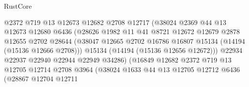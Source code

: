 \begin{lexlean}{RustCore}
\begin{coremodule}
                                  @2372
                                  @719
                                  @13
                                  @12673
                                  @12682
                                  @2708
                                  @12717
                                  (@38024
                                    @2369
                                    @44
                                    @13
                                    @12673
                                    @12680
                                    @6436
                                    (@28626
                                      @1982
                                      @11
                                      @41
                                      @8721
                                      @12672
                                      @12679
                                      @2878
                                      @12655
                                      @2702
                                      @28644
                                      (@38047
                                        @12665
                                        @2702
                                        @16786
                                        @16807
                                        @15134
                                        (@14194 (@15136 @12666 @2708)))
                                      @15134
                                      (@14194 (@15136 @12656 @12672)))
                                    @22934
                                    @22937
                                    @22940
                                    @22944
                                    @22949
                                    @34286)
                                  (@16849
                                    @12682
                                    @2372
                                    @719
                                    @13
                                    @12705
                                    @12714
                                    @2708
                                    @3964
                                    (@38024
                                      @1633
                                      @44
                                      @13
                                      @12705
                                      @12712
                                      @6436
                                      (@28867
                                        @12704
                                        @12711

\end{coremodule}
\end{lexlean}
